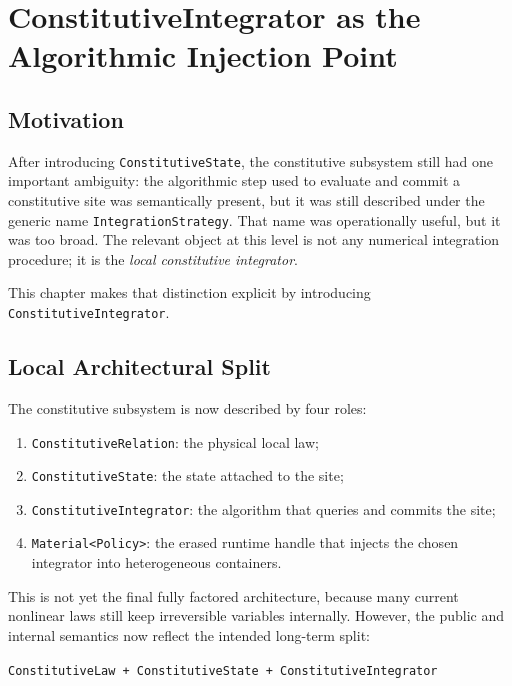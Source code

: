 \chapter{ConstitutiveIntegrator as the Algorithmic Injection Point}

\section{Motivation}

After introducing \texttt{ConstitutiveState}, the constitutive subsystem still
had one important ambiguity: the algorithmic step used to evaluate and commit a
constitutive site was semantically present, but it was still described under
the generic name \texttt{IntegrationStrategy}.  That name was operationally
useful, but it was too broad.  The relevant object at this level is not any
numerical integration procedure; it is the \emph{local constitutive
integrator}.

This chapter makes that distinction explicit by introducing
\texttt{ConstitutiveIntegrator}.

\section{Local Architectural Split}

The constitutive subsystem is now described by four roles:

\begin{enumerate}
  \item \texttt{ConstitutiveRelation}: the physical local law;
  \item \texttt{ConstitutiveState}: the state attached to the site;
  \item \texttt{ConstitutiveIntegrator}: the algorithm that queries and commits
        the site;
  \item \texttt{Material<Policy>}: the erased runtime handle that injects the
        chosen integrator into heterogeneous containers.
\end{enumerate}

This is not yet the final fully factored architecture, because many current
nonlinear laws still keep irreversible variables internally.  However, the
public and internal semantics now reflect the intended long-term split:

\begin{center}
\texttt{ConstitutiveLaw + ConstitutiveState + ConstitutiveIntegrator}
\end{center}


